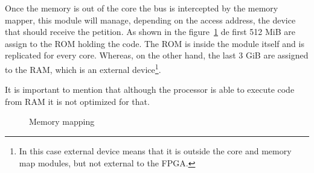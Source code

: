 Once the memory is out of the core the bus is intercepted by the memory mapper,
this module will manage, depending on the access address, the device that
should receive the petition. As shown in the figure~\ref{fig:memory_map} de
first 512 MiB are assign to the ROM holding the code. The ROM is inside the module itself
and is replicated for every core. Whereas, on the other hand, the last 3 GiB
are assigned to the RAM, which is an external device\footnote{In this case external 
device means that it is outside the core and memory map modules, but not external
to the FPGA.}.

It is important to mention that although the processor is able to execute code
from RAM it is not optimized for that.


\begin{figure}
  \centering

  \caption{Memory mapping}
  \label{fig:memory_map}

\end{figure}


